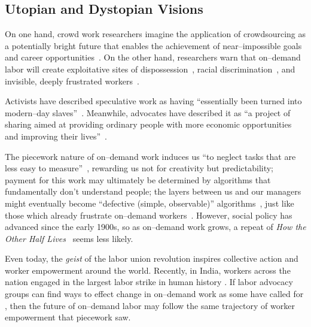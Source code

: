 \documentclass[trackingWork]{subfiles}
\begin{document}
\subsection{Utopian and Dystopian Visions}\label{sec:polarizationOfCrowdWork}
On one hand, crowd work researchers
imagine the application of crowdsourcing as
a potentially bright future that enables the achievement of near--impossible goals and career opportunities~\cite{redballoon,crowdworkFuture,vizwiz,suzukiAtelier}.
On the other hand, researchers
warn that on--demand labor will create exploitative sites of dispossession~\cite{scholz2012digital},
racial discrimination~\cite{edelman2015racial},
and invisible, deeply frustrated workers~\cite{turkopticon,bighamHalfWorkday}.

Activists have described speculative work as having
``essentially been turned into modern--day slaves''~\cite{activistsHuffPoLawsuit}.
Meanwhile, advocates have described it as
``a project of sharing aimed at providing ordinary people with more economic opportunities and improving their lives''~\cite{uberPropaganda}.

The piecework nature of on--demand work induces us
``to neglect tasks that are less easy to measure''~\cite{SJOE:SJOE371},
rewarding us not for creativity but predictability;
payment for this work may ultimately be determined by
algorithms that fundamentally don't understand people;
the layers between us and our managers might eventually become
``defective (simple, observable)'' algorithms~\cite{10.2307/2555446},
just like those which already frustrate
on--demand workers~\cite{uberAlgorithm,dynamo,turkopticon}.
However, social policy has advanced since the early 1900s, so as on--demand work grows, a repeat of \textit{How the Other Half Lives}~\cite{riisOtherSideLives} seems less likely.

Even today, the \textit{geist} of the labor union revolution
inspires collective action and worker empowerment around the world.
Recently, in India, workers across the nation engaged in
the largest labor strike in human history
\cite{indiaStrikeRealNews}.
If labor advocacy groups can find ways to effect change in on--demand work as some have called for
\cite{futureUnions},
then the future of on--demand labor may follow
the same trajectory of worker empowerment that piecework saw.
\end{document}
